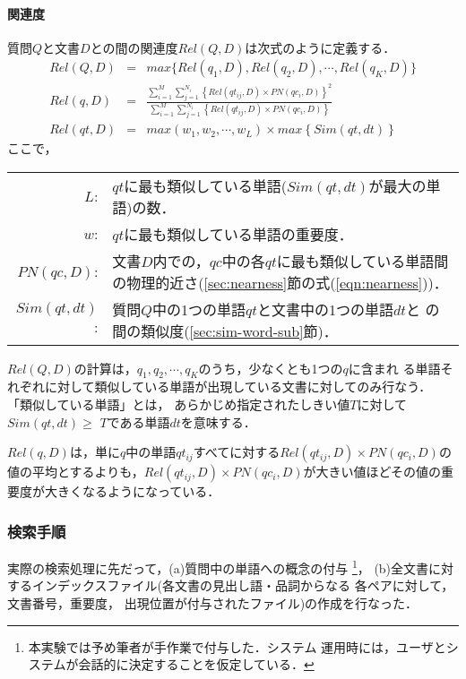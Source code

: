 \paragraph{関連度}\label{sec:similarity}
\vspace*{-1mm}

  質問$Q$と文書$D$との間の関連度$Rel(Q, D)$は次式のように定義する．
\begin{eqnarray}
  Rel(Q, D) & = & max\{Rel(q_1, D), Rel(q_2, D),\cdots, Rel(q_K, D)\}\label{eqn:sim-qda}\\[1ex]
  Rel(q, D) & = & \frac{\displaystyle 
        \sum_{i=1}^{M}\sum_{j=1}^{N_i}{\left\{Rel(qt_{ij}, D)\times PN(qc_i, D)\right\}}^2}
        {\displaystyle \sum_{i=1}^{M}\sum_{j=1}^{N_i}\left\{Rel(qt_{ij}, D)\times PN(qc_i, D)\right\}}\nonumber\\[1ex]
  Rel(qt, D) & = & max(w_1, w_2, \cdots, w_L)\times max\left\{Sim(qt,dt)\right\}\nonumber
\end{eqnarray}
ここで，
\begin{center}
\begin{tabular}[t]{rp{110mm}}
  $L$: & $qt$に最も類似している単語($Sim(qt,dt)$が最大の単語)の数．\\
  $w$: & $qt$に最も類似している単語の重要度．\\
  $PN(qc, D)$: & 文書$D$内での，\hspace{-0.3mm}$qc$中の各$qt$に最も類似している単語間の物理的近さ\hspace{-0.2mm}(\ref{sec:nearness}節の式(\ref{eqn:nearness}))．\\
  $Sim(qt,dt)$: &   質問$Q$中の1つの単語$qt$と文書中の1つの単語$dt$と
  の間の類似度(\ref{sec:sim-word-sub}節)．
\end{tabular}
\end{center}

 $Rel(Q, D)$の計算は，$q_1, q_2, \cdots, q_K$のうち，少なくとも1つの$q$に含まれ
る単語それぞれに対して{\dg 類似している単語}が出現している文書に対してのみ行なう．
  「類似している単語」とは，
あらかじめ指定されたしきい値$T$に対して
{\boldmath $Sim(qt,dt)\ge$}
{\boldmath $T$}である単語$dt$を意味する．

  $Rel(q, D)$は，\hspace{-0.3mm}単に$q$中の単語$qt_{ij}$すべてに対する$Rel(qt_{ij},
D)\times PN(qc_i, D)$の値の平均とするよりも，$Rel(qt_{ij}, D)\times PN(qc_i, D)$が大きい値ほどその値の重要度が大きくなるようになっている．

\subsubsection{検索手順}\label{sec:step}
  実際の検索処理に先だって，(a)質問中の単語への概念の付与
\footnote{本実験では予め筆者が手作業で付与した．システム
運用時には，ユーザとシステムが会話的に決定することを仮定している．}，
(b)全文書に対
するインデックスファイル(各文書の見出し語・品詞からなる
各ペアに対して，文書番号，重要度，
出現位置が付与されたファイル)の作成を行なった．

